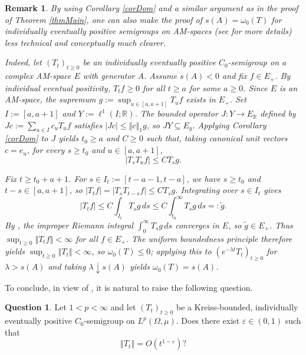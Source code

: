 \documentclass[12pt]{amsart}
\theoremstyle{plain}
\newtheorem{remark}[thm]{Remark}
\theoremstyle{definition}
\newtheorem{q}[thm]{Question}
\newcommand{\norm}[1]{\left\Vert #1\right\Vert}
\begin{document}
	\begin{remark}
		By using Corollary \ref{corDom} and a similar argument as in the proof of Theorem \ref{thmMain}, one can also make the proof of $s(A) = \omega_0(T)$ for individually eventually positive semigroups on AM-spaces (see \cite{AroraGlueck2022} for more details) less technical and conceptually much clearer.
		
		Indeed, let $(T_t)_{t\ge 0}$ be an individually eventually positive $C_0$-semigroup on a complex AM-space $E$ with generator $A$. Assume $s(A) < 0$ and fix $f\in E_+$. By individual eventual positivity, $T_t f \ge 0$ for all $t \ge a$ for some $a \ge 0$. Since $E$ is an AM-space, the supremum $g := \sup_{u\in[a,a+1]} T_u f$ exists in $E_+$.
		Set $I := [a,a+1]$ and $Y := \ell^1(I;\mathbb{R})$. The bounded operator $J \colon Y \to E_{\mathbb{R}}$ defined by $Jc := \sum_{u\in I} c_u T_u f$ satisfies $|Jc| \le \norm{c}_1 g$, so $JY \subseteq E_g$.
		Applying Corollary \ref{corDom} to $J$ yields $t_0 \ge a$ and $C \ge 0$ such that, taking canonical unit vectors $c = e_u$, for every $s \ge t_0$ and $u \in [a,a+1]$,
		\[
		|T_s T_u f| \le C T_s g.
		\]
		
		Fix $t \ge t_0 + a + 1$. For $s \in I_t := [t-a-1, t-a]$, we have $s \ge t_0$ and $t-s \in [a,a+1]$, so $|T_t f| = |T_s T_{t-s} f| \le C T_s g$. Integrating over $s \in I_t$ gives
		\[
		|T_t f| \le C \int_{I_t} T_s g \, ds \le C \int_{t_0}^\infty T_s g \, ds =: \widetilde{g}.
		\]
		By \cite[Proposition 7.1]{DanersGlueckKennedy}, the improper Riemann integral $\int_0^\infty T_s g \, ds$ converges in $E$, so $\widetilde{g} \in E_+$. Thus $\sup_{t \ge 0} \norm{T_t f} < \infty$ for all $f \in E_+$. 
		The uniform boundedness principle therefore yields $\sup_{t\ge0}\norm{T_t}<\infty$, so $\omega_0(T)\le0$; applying this to $(e^{-\lambda t}T_t)_{t\ge0}$ for $\lambda>s(A)$ and taking $\lambda\downarrow s(A)$ yields $\omega_0(T)=s(A)$.
	\end{remark}
	
	To conclude, in view of \cite{Arnold2026, ArnoldCoine2023}, it is natural to raise the following question.
	
	\begin{q}
		Let $1 < p < \infty$ and let $(T_t)_{t\ge 0}$ be a Kreiss-bounded, individually eventually positive $C_0$-semigroup on $L^p(\Omega,\mu)$. Does there exist $\varepsilon \in (0,1)$ such that 
		\[
		\norm{T_t} = O(t^{1-\varepsilon}) ?
		\]
	\end{q}
	
\end{document}
